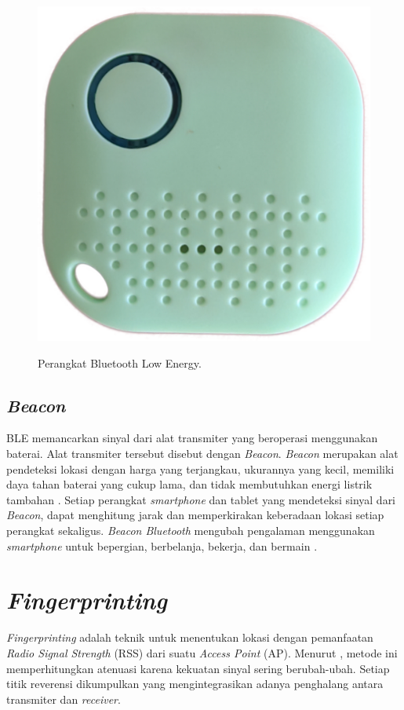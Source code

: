 \begin{figure}[H]
\centering
{\includegraphics [scale= .1]{gambar/bab2/BLE_Device}}
\caption{Perangkat Bluetooth Low Energy.}
\label{img:BLE_device}
\end{figure}

\newpage

\subsection{\textit{Beacon}}
BLE memancarkan sinyal dari alat transmiter yang beroperasi menggunakan baterai. Alat transmiter tersebut disebut dengan \textit{Beacon}. \textit{Beacon} merupakan alat pendeteksi lokasi dengan harga yang terjangkau, ukurannya yang kecil, memiliki daya tahan baterai yang cukup lama, dan tidak membutuhkan energi listrik tambahan \citep{puspitasari2020}. Setiap perangkat \textit{smartphone} dan tablet yang mendeteksi sinyal dari \textit{Beacon}, dapat menghitung jarak dan memperkirakan keberadaan lokasi setiap perangkat sekaligus. \textit{Beacon Bluetooth} mengubah pengalaman menggunakan \textit{smartphone} untuk bepergian, berbelanja, bekerja, dan bermain \citep{kaluvza2017analysis}.

\section{\textit{Fingerprinting}}
\textit{Fingerprinting} adalah teknik untuk menentukan lokasi dengan pemanfaatan \textit{Radio Signal Strength} (RSS) dari suatu \textit{Access Point }(AP). Menurut \citep{yudha2018indoor} , metode ini memperhitungkan atenuasi karena kekuatan sinyal sering berubah-ubah. Setiap titik reverensi dikumpulkan yang mengintegrasikan adanya penghalang antara transmiter dan \textit{receiver}.


